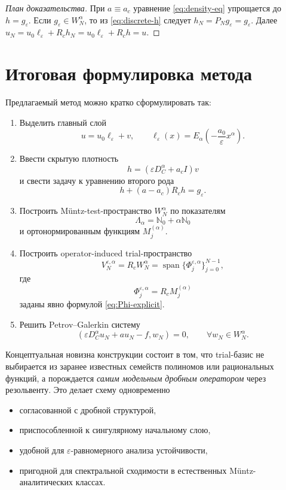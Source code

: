\documentclass[12pt,a4paper]{article}
\theoremstyle{definition}
\newcommand{\eps}{\varepsilon}
\newcommand{\Nc}{\mathbb{N}_0}
\newcommand{\Dc}{D_C^\alpha}
\newcommand{\Rc}{R_c}
\newcommand{\Span}{\operatorname{span}}
\newcommand{\inner}[2]{\left(#1,#2\right)}
\begin{document}
\begin{proof}[План доказательства]
При $a\equiv a_c$ уравнение \eqref{eq:density-eq} упрощается до $h=g_\eps$.
Если $g_\eps\in W_N^\alpha$, то из \eqref{eq:discrete-h} следует $h_N=P_Ng_\eps=g_\eps$.
Далее $u_N=u_0\ell_\eps+\Rc h_N=u_0\ell_\eps+\Rc h=u$.
\end{proof}

\section{Итоговая формулировка метода}

Предлагаемый метод можно кратко сформулировать так:

\begin{enumerate}[label=\textbf{Шаг \arabic*.}]
\item Выделить главный слой
\[
u=u_0\ell_\eps+v,
\qquad
\ell_\eps(x)=E_\alpha\!\left(-\frac{a_0}{\eps}x^\alpha\right).
\]

\item Ввести скрытую плотность
\[
h=(\eps \Dc + a_c I)v
\]
и свести задачу к уравнению второго рода
\[
h+(a-a_c)\Rc h=g_\eps.
\]

\item Построить M\"untz-test-пространство $W_N^\alpha$ по показателям
\[
\Lambda_\alpha=\Nc+\alpha\Nc
\]
и ортонормированным функциям $M_j^{(\alpha)}$.

\item Построить operator-induced trial-пространство
\[
V_N^{\eps,\alpha}=\Rc W_N^\alpha
=
\Span\{\Phi_j^{\eps,\alpha}\}_{j=0}^{N-1},
\]
где
\[
\Phi_j^{\eps,\alpha}=\Rc M_j^{(\alpha)}
\]
заданы явно формулой \eqref{eq:Phi-explicit}.

\item Решить Petrov--Galerkin систему
\[
\inner{\eps \Dc u_N + a u_N - f}{w_N}=0,
\qquad \forall w_N\in W_N^\alpha.
\]
\end{enumerate}

Концептуальная новизна конструкции состоит в том, что trial-базис
не выбирается из заранее известных семейств полиномов или рациональных функций,
а порождается \emph{самим модельным дробным оператором} через резольвенту.
Это делает схему одновременно
\begin{itemize}
\item согласованной с дробной структурой,
\item приспособленной к сингулярному начальному слою,
\item удобной для $\eps$-равномерного анализа устойчивости,
\item пригодной для спектральной сходимости в естественных M\"untz-аналитических классах.
\end{itemize}
\end{document}
